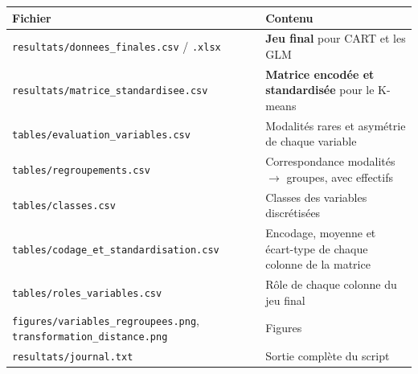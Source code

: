 \documentclass[

  french,

  10pt,

  a4paper,

]{article}
\newcounter{none} %
\begin{document}
{\def\LTcaptype{none} %

\begin{longtable}[]{@{}

  >{\raggedright\arraybackslash}p{}

  >{\raggedright\arraybackslash}p{}@{}}

\toprule\noalign{}

\begin{minipage}[b]{\linewidth}\raggedright

Fichier

\end{minipage} & \begin{minipage}[b]{\linewidth}\raggedright

Contenu

\end{minipage} \\

\midrule\noalign{}

\endhead

\bottomrule\noalign{}

\endlastfoot

\texttt{resultats/donnees\_finales.csv} / \texttt{.xlsx} & \textbf{Jeu final} pour CART et les GLM \\

\texttt{resultats/matrice\_standardisee.csv} & \textbf{Matrice encodée et standardisée} pour le K-means \\

\texttt{tables/evaluation\_variables.csv} & Modalités rares et asymétrie de chaque variable \\

\texttt{tables/regroupements.csv} & Correspondance modalités \ensuremath{\rightarrow} groupes, avec effectifs \\

\texttt{tables/classes.csv} & Classes des variables discrétisées \\

\texttt{tables/codage\_et\_standardisation.csv} & Encodage, moyenne et écart-type de chaque colonne de la matrice \\

\texttt{tables/roles\_variables.csv} & Rôle de chaque colonne du jeu final \\

\texttt{figures/variables\_regroupees.png}, \texttt{transformation\_distance.png} & Figures \\

\texttt{resultats/journal.txt} & Sortie complète du script \\

\end{longtable}

}
\end{document}
